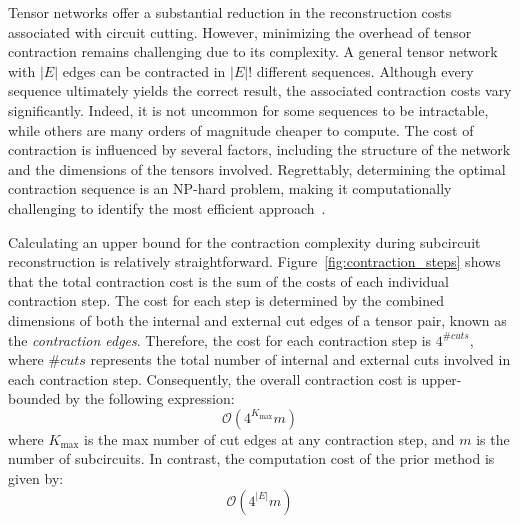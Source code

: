 Tensor networks offer a substantial reduction in the reconstruction costs associated with circuit cutting.
However, minimizing the overhead of tensor contraction remains challenging due to its complexity.
A general tensor network with $|E|$ edges can be contracted in $|E|!$ different sequences.
Although every sequence ultimately yields the correct result,
the associated contraction costs vary significantly.
Indeed, it is not uncommon for some sequences to be intractable,
while others are many orders of magnitude cheaper to compute.
The cost of contraction is influenced by several factors,
including the structure of the network and the dimensions of the tensors involved.
Regrettably, determining the optimal contraction sequence is an NP-hard problem,
making it computationally challenging to identify the most efficient approach~\cite{markov2008simulating, arnborg1987complexity, chi1997optimizing}.

Calculating an upper bound for the contraction complexity during subcircuit reconstruction is relatively straightforward.
Figure~\ref{fig:contraction_steps} shows that the total contraction cost is the sum of the costs of each individual contraction step.
The cost for each step is determined by the combined dimensions of both the internal and external cut edges of a tensor pair,
known as the \emph{contraction edges}.
Therefore, the cost for each contraction step is $4^{\#cuts}$,
where $\#cuts$ represents the total number of internal and external cuts involved in each contraction step.
Consequently, the overall contraction cost is upper-bounded by the following expression:
\begin{equation}
    \mathcal{O}(4^{K_{\max}}m)\label{eq:tn_upper_bound}
\end{equation}
where $K_{\max}$ is the max number of cut edges at any contraction step,
and $m$ is the number of subcircuits.
In contrast, the computation cost of the prior method is given by:
\begin{equation}
    \mathcal{O}(4^{|E|}m)\label{eq:prior_complexity}
\end{equation}

